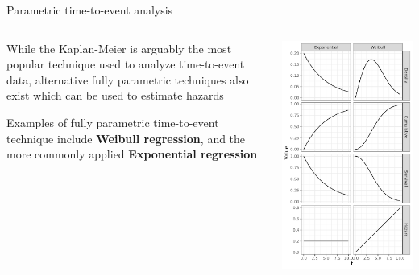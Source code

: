\documentclass[
  ignorenonframetext,
]{beamer}
\begin{document}
\begin{frame}{Parametric time-to-event analysis}
\label{parametric-time-to-event-analysis}
\begin{columns}[T]
\begin{column}{0.7\textwidth}
While the Kaplan-Meier is arguably the most popular technique used to
analyze time-to-event data, alternative fully parametric techniques also
exist which can be used to estimate hazards

Examples of fully parametric time-to-event technique include
\textbf{Weibull regression}, and the more commonly applied
\textbf{Exponential regression}
\end{column}

\begin{column}{0.3\textwidth}
\includegraphics{figures/weiExpFig.png}
\end{column}
\end{columns}
\end{frame}
\end{document}
